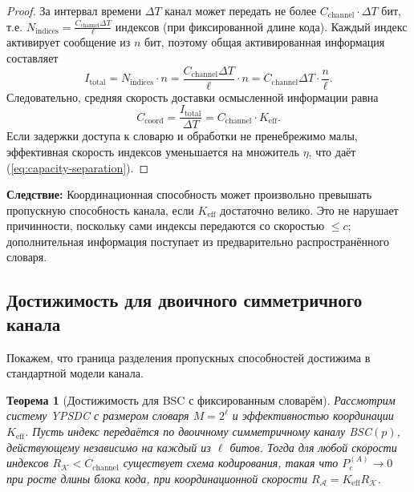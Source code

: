\documentclass[12pt,a4paper]{article}
\newtheorem{theorem}{Теорема}[section]
\theoremstyle{remark}
\newcommand{\Keff}{K_{\mathrm{eff}}}
\begin{document}
	\begin{proof}
		За интервал времени $\Delta T$ канал может передать не более $C_{\text{channel}} \cdot \Delta T$ бит, т.е. $N_{\text{indices}} = \frac{C_{\text{channel}} \Delta T}{\ell}$ индексов (при фиксированной длине кода). Каждый индекс активирует сообщение из $n$ бит, поэтому общая активированная информация составляет
		\[
		I_{\text{total}} = N_{\text{indices}} \cdot n = \frac{C_{\text{channel}} \Delta T}{\ell} \cdot n = C_{\text{channel}} \Delta T \cdot \frac{n}{\ell}.
		\]
		Следовательно, средняя скорость доставки осмысленной информации равна
		\[
		C_{\text{coord}} = \frac{I_{\text{total}}}{\Delta T} = C_{\text{channel}} \cdot \Keff.
		\]
		Если задержки доступа к словарю и обработки не пренебрежимо малы, эффективная скорость индексов уменьшается на множитель $\eta$, что даёт (\ref{eq:capacity-separation}).
	\end{proof}
	
	\noindent
	\textbf{Следствие:} Координационная способность может произвольно превышать пропускную способность канала, если $\Keff$ достаточно велико. Это не нарушает причинности, поскольку сами индексы передаются со скоростью $\le c$; дополнительная информация поступает из предварительно распространённого словаря.
	
	\subsection{Достижимость для двоичного симметричного канала}
	\label{subsec:BSC-achievability}
	
	Покажем, что граница разделения пропускных способностей достижима в стандартной модели канала.
	
	\begin{theorem}[Достижимость для BSC с фиксированным словарём]
		Рассмотрим систему YPSDC с размером словаря \(M = 2^\ell\) и эффективностью координации \(K_{\mathrm{eff}}\). Пусть индекс передаётся по двоичному симметричному каналу BSC\((p)\), действующему независимо на каждый из \(\ell\) битов. Тогда для любой скорости индексов \(R_{\mathcal{K}} < C_{\mathrm{channel}}\) существует схема кодирования, такая что \(P_e^{(A)} \to 0\) при росте длины блока кода, при координационной скорости \(R_{\mathcal{A}} = K_{\mathrm{eff}} R_{\mathcal{K}}\).
	\end{theorem}
	
\end{document}
